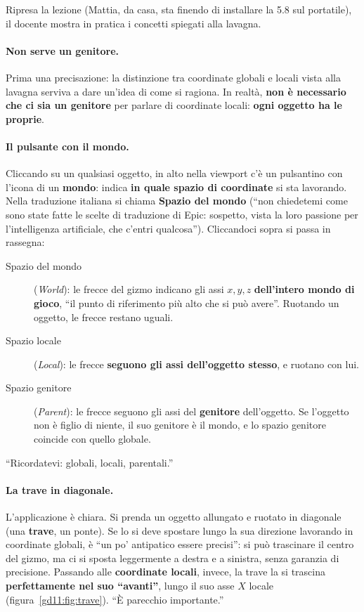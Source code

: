 Ripresa la lezione (Mattia, da casa, sta finendo di installare la 5.8 sul
portatile), il docente mostra in pratica i concetti spiegati alla lavagna.

\paragraph{Non serve un genitore.} Prima una precisazione: la distinzione tra
coordinate globali e locali vista alla lavagna serviva a dare un'idea di come si
ragiona. In realtà, \textbf{non è necessario che ci sia un genitore} per parlare
di coordinate locali: \textbf{ogni oggetto ha le proprie}.

\paragraph{Il pulsante con il mondo.} Cliccando su un qualsiasi oggetto, in
alto nella viewport c'è un pulsantino con l'icona di un \textbf{mondo}: indica
\textbf{in quale spazio di coordinate} si sta lavorando. Nella traduzione
italiana si chiama \textbf{Spazio del mondo} (``non chiedetemi come sono state
fatte le scelte di traduzione di Epic: sospetto, vista la loro passione per
l'intelligenza artificiale, che c'entri qualcosa''). Cliccandoci sopra si passa
in rassegna:
\begin{description}
  \item[Spazio del mondo] (\emph{World}): le frecce del gizmo indicano gli assi
        $x, y, z$ \textbf{dell'intero mondo di gioco}, ``il punto di
        riferimento più alto che si può avere''. Ruotando un oggetto, le frecce
        restano uguali.
  \item[Spazio locale] (\emph{Local}): le frecce \textbf{seguono gli assi
        dell'oggetto stesso}, e ruotano con lui.
  \item[Spazio genitore] (\emph{Parent}): le frecce seguono gli assi del
        \textbf{genitore} dell'oggetto. Se l'oggetto non è figlio di niente, il
        suo genitore è il mondo, e lo spazio genitore coincide con quello
        globale.
\end{description}
``Ricordatevi: globali, locali, parentali.''

\paragraph{La trave in diagonale.} L'applicazione è chiara. Si prenda un
oggetto allungato e ruotato in diagonale (una \textbf{trave}, un ponte). Se lo
si deve spostare lungo la sua direzione lavorando in coordinate globali, è
``un po' antipatico essere precisi'': si può trascinare il centro del gizmo, ma
ci si sposta leggermente a destra e a sinistra, senza garanzia di precisione.
Passando alle \textbf{coordinate locali}, invece, la trave la si trascina
\textbf{perfettamente nel suo ``avanti''}, lungo il suo asse $X$ locale
(figura~\ref{gd11:fig:trave}). ``È parecchio importante.''

